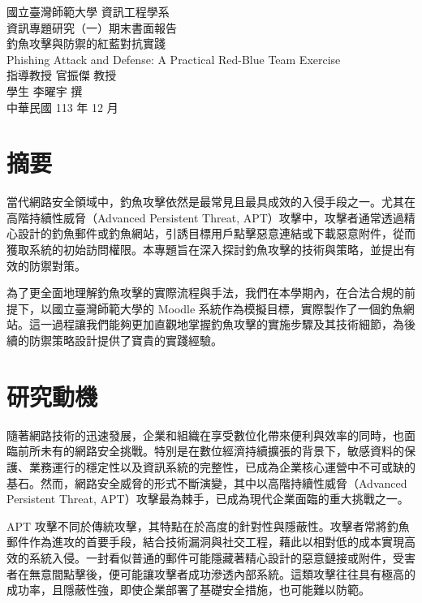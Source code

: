\documentclass[a4paper,12pt]{article}
\begin{document}
\begin{titlepage}
  \begin{center}
    \vspace*{2cm}
    {\fontsize{16pt}{16pt}\selectfont 國立臺灣師範大學 資訊工程學系}\\[1cm]
    {\fontsize{16pt}{16pt} 資訊專題研究（一）期末書面報告}\\[4cm]
    {\fontsize{16pt}{16pt}\selectfont 釣魚攻擊與防禦的紅藍對抗實踐}\\[1cm]
    {\fontsize{16pt}{16pt}\selectfont Phishing Attack and Defense: A Practical Red-Blue Team Exercise}\\[9cm]
    {\fontsize{12pt}{12pt}\selectfont 指導教授 官振傑 教授}\\[0.5cm]
    {\fontsize{12pt}{12pt}\selectfont 學生 李曜宇 撰}\\[0.5cm]
    {\fontsize{12pt}{12pt}\selectfont 中華民國 113 年 12 月}
  \end{center}
\end{titlepage}

\newpage

\section{摘要}
當代網路安全領域中，釣魚攻擊依然是最常見且最具成效的入侵手段之一。尤其在高階持續性威脅（Advanced Persistent Threat, APT）攻擊中，攻擊者通常透過精心設計的釣魚郵件或釣魚網站，引誘目標用戶點擊惡意連結或下載惡意附件，從而獲取系統的初始訪問權限。本專題旨在深入探討釣魚攻擊的技術與策略，並提出有效的防禦對策。

為了更全面地理解釣魚攻擊的實際流程與手法，我們在本學期內，在合法合規的前提下，以國立臺灣師範大學的 Moodle 系統作為模擬目標，實際製作了一個釣魚網站。這一過程讓我們能夠更加直觀地掌握釣魚攻擊的實施步驟及其技術細節，為後續的防禦策略設計提供了寶貴的實踐經驗。

\section{研究動機}
隨著網路技術的迅速發展，企業和組織在享受數位化帶來便利與效率的同時，也面臨前所未有的網路安全挑戰。特別是在數位經濟持續擴張的背景下，敏感資料的保護、業務運行的穩定性以及資訊系統的完整性，已成為企業核心運營中不可或缺的基石。然而，網路安全威脅的形式不斷演變，其中以高階持續性威脅（Advanced Persistent Threat, APT）攻擊最為棘手，已成為現代企業面臨的重大挑戰之一。

APT 攻擊不同於傳統攻擊，其特點在於高度的針對性與隱蔽性。攻擊者常將釣魚郵件作為進攻的首要手段，結合技術漏洞與社交工程，藉此以相對低的成本實現高效的系統入侵。一封看似普通的郵件可能隱藏著精心設計的惡意鏈接或附件，受害者在無意間點擊後，便可能讓攻擊者成功滲透內部系統。這類攻擊往往具有極高的成功率，且隱蔽性強，即使企業部署了基礎安全措施，也可能難以防範。
\end{document}
